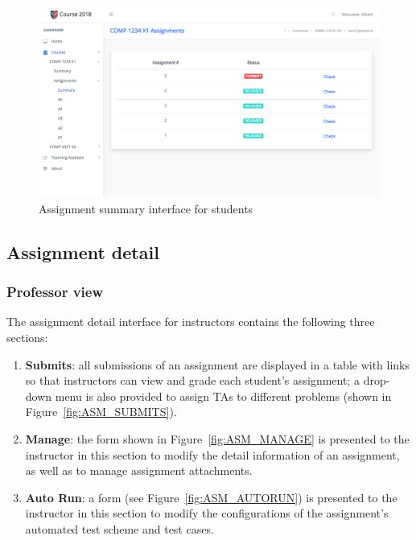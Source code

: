 \begin{figure}[H]
    \centering
        \includegraphics[width=1.0\textwidth]{figures/asm-summary-student}
    \caption{Assignment summary interface for students}
    \label{fig:ASM_SUMMARY_STUDENT}
\end{figure}

\subsection{Assignment detail}

\subsubsection{Professor view}
The assignment detail interface for instructors contains the following three
sections:

\begin{enumerate}
    \item \textbf{Submits}: all submissions of an assignment are displayed
        in a table with links so that instructors can view and grade each
        student's assignment; a drop-down menu is also provided to assign TAs
        to different problems (shown in Figure~\ref{fig:ASM_SUBMITS}).
    \item \textbf{Manage}: the form shown in Figure~\ref{fig:ASM_MANAGE} is
        presented to the instructor in this section
        to modify the detail information of an assignment, as well as to
        manage assignment attachments.
    \item \textbf{Auto Run}: a form (see Figure~\ref{fig:ASM_AUTORUN}) is
        presented to the instructor in this
        section to modify the configurations of the assignment's automated
        test scheme and test cases.
\end{enumerate}

